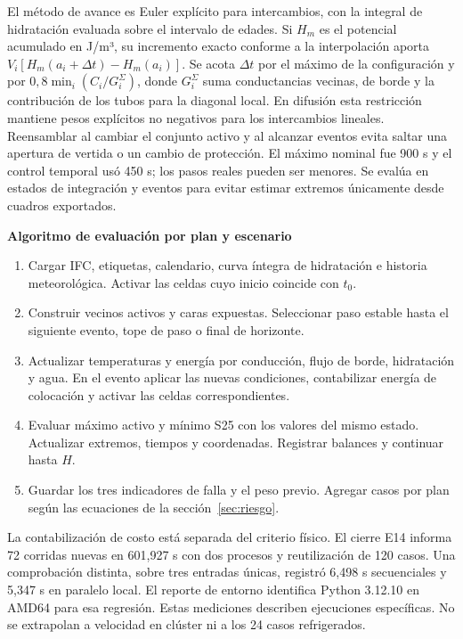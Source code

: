 \documentclass[11pt,a4paper]{article}
\begin{document}
El método de avance es Euler explícito para intercambios, con la integral de hidratación evaluada sobre el intervalo de edades. Si $H_m$ es el potencial acumulado en J/m³, su incremento exacto conforme a la interpolación aporta $V_i[H_m(a_i+\Delta t)-H_m(a_i)]$. Se acota $\Delta t$ por el máximo de la configuración y por $0{,}8\min_i(C_i/G_i^\Sigma)$, donde $G_i^\Sigma$ suma conductancias vecinas, de borde y la contribución de los tubos para la diagonal local. En difusión esta restricción mantiene pesos explícitos no negativos para los intercambios lineales. Reensamblar al cambiar el conjunto activo y al alcanzar eventos evita saltar una apertura de vertida o un cambio de protección. El máximo nominal fue 900 s y el control temporal usó 450 s; los pasos reales pueden ser menores. Se evalúa en estados de integración y eventos para evitar estimar extremos únicamente desde cuadros exportados.

\smallskip
\textbf{Algoritmo de evaluación por plan y escenario}
\begin{enumerate}
\item Cargar IFC, etiquetas, calendario, curva íntegra de hidratación e historia meteorológica. Activar las celdas cuyo inicio coincide con $t_0$.
\item Construir vecinos activos y caras expuestas. Seleccionar paso estable hasta el siguiente evento, tope de paso o final de horizonte.
\item Actualizar temperaturas y energía por conducción, flujo de borde, hidratación y agua. En el evento aplicar las nuevas condiciones, contabilizar energía de colocación y activar las celdas correspondientes.
\item Evaluar máximo activo y mínimo S25 con los valores del mismo estado. Actualizar extremos, tiempos y coordenadas. Registrar balances y continuar hasta $H$.
\item Guardar los tres indicadores de falla y el peso previo. Agregar casos por plan según las ecuaciones de la sección~\ref{sec:riesgo}.
\end{enumerate}
La contabilización de costo está separada del criterio físico. El cierre E14 informa 72 corridas nuevas en 601,927 s con dos procesos y reutilización de 120 casos. Una comprobación distinta, sobre tres entradas únicas, registró 6,498 s secuenciales y 5,347 s en paralelo local. El reporte de entorno identifica Python 3.12.10 en AMD64 para esa regresión. Estas mediciones describen ejecuciones específicas. No se extrapolan a velocidad en clúster ni a los 24 casos refrigerados.
\end{document}
